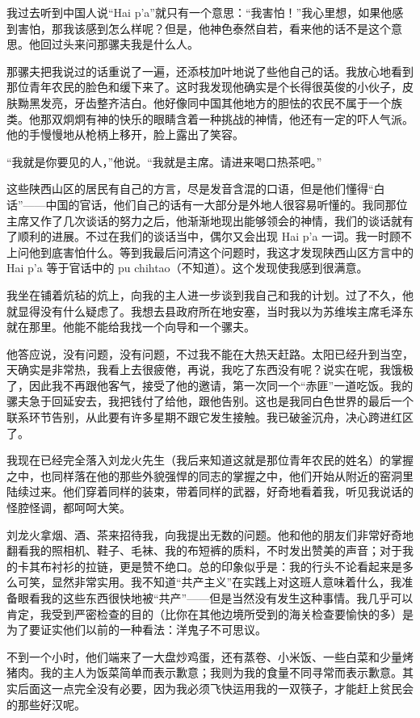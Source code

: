 \documentclass[10pt]{book}
\begin{document}
我过去听到中国人说“Hai p'a”就只有一个意思：“我害怕！”我心里想，如果他感到害怕，那我该感到怎么样呢？但是，他神色泰然自若，看来他的话不是这个意思。他回过头来问那骡夫我是什么人。

那骡夫把我说过的话重说了一遍，还添枝加叶地说了些他自己的话。我放心地看到那位青年农民的脸色和缓下来了。这时我发现他确实是个长得很英俊的小伙子，皮肤黝黑发亮，牙齿整齐洁白。他好像同中国其他地方的胆怯的农民不属于一个族类。他那双炯炯有神的快乐的眼睛含着一种挑战的神情，他还有一定的吓人气派。他的手慢慢地从枪柄上移开，脸上露出了笑容。

“我就是你要见的人，”他说。“我就是主席。请进来喝口热茶吧。”

这些陕西山区的居民有自己的方言，尽是发音含混的口语，但是他们懂得“白话”——中国的官话，他们自己的话有一大部分是外地人很容易听懂的。我同那位主席又作了几次谈话的努力之后，他渐渐地现出能够领会的神情，我们的谈话就有了顺利的进展。不过在我们的谈话当中，偶尔又会出现 Hai p'a 一词。我一时顾不上问他到底害怕什么。等到我最后问清这个问题时，我这才发现陕西山区方言中的 Hai p'a 等于官话中的 pu chihtao（不知道）。这个发现使我感到很满意。

我坐在铺着炕毡的炕上，向我的主人进一步谈到我自己和我的计划。过了不久，他就显得没有什么疑虑了。我想去县政府所在地安塞，当时我以为苏维埃主席毛泽东就在那里。他能不能给我找一个向导和一个骡夫。

他答应说，没有问题，没有问题，不过我不能在大热天赶路。太阳已经升到当空，天确实是非常热，我看上去很疲倦，再说，我吃了东西没有呢？说实在呢，我饿极了，因此我不再跟他客气，接受了他的邀请，第一次同一个“赤匪”一道吃饭。我的骡夫急于回延安去，我把钱付了给他，跟他告别。这也是我同白色世界的最后一个联系环节告别，从此要有许多星期不跟它发生接触。我已破釜沉舟，决心跨进红区了。

我现在已经完全落入刘龙火先生（我后来知道这就是那位青年农民的姓名）的掌握之中，也同样落在他的那些外貌强悍的同志的掌握之中，他们开始从附近的窑洞里陆续过来。他们穿着同样的装束，带着同样的武器，好奇地看着我，听见我说话的怪腔怪调，都呵呵大笑。

刘龙火拿烟、酒、茶来招待我，向我提出无数的问题。他和他的朋友们非常好奇地翻看我的照相机、鞋子、毛袜、我的布短裤的质料，不时发出赞美的声音；对于我的卡其布衬衫的拉链，更是赞不绝口。总的印象似乎是：我的行头不论看起来是多么可笑，显然非常实用。我不知道“共产主义”在实践上对这班人意味着什么，我准备眼看我的这些东西很快地被“共产”——但是当然没有发生这种事情。我几乎可以肯定，我受到严密检查的目的（比你在其他边境所受到的海关检查要愉快的多）是为了要证实他们以前的一种看法：洋鬼子不可思议。

不到一个小时，他们端来了一大盘炒鸡蛋，还有蒸卷、小米饭、一些白菜和少量烤猪肉。我的主人为饭菜简单而表示歉意；我则为我的食量不同寻常而表示歉意。其实后面这一点完全没有必要，因为我必须飞快运用我的一双筷子，才能赶上贫民会的那些好汉呢。
\end{document}

